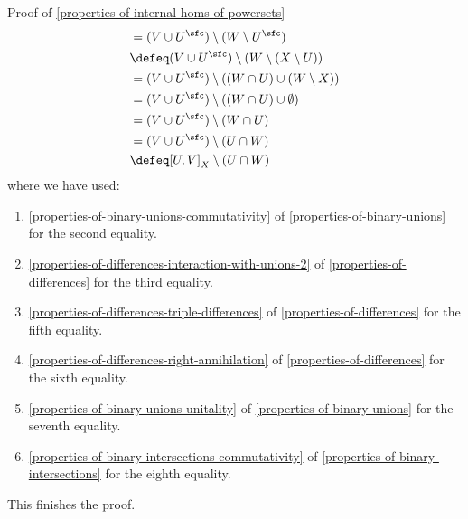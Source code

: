 \begin{Proof}{Proof of \cref{properties-of-internal-homs-of-powersets}}
\begin{align*}
                             &=      (V\cup U^{\sfc})\setminus(W\setminus U^{\sfc})\\
                             &\defeq (V\cup U^{\sfc})\setminus(W\setminus(X\setminus U))\\
                             &=      (V\cup U^{\sfc})\setminus((W\cap U)\cup(W\setminus X))\\
                             &=      (V\cup U^{\sfc})\setminus((W\cap U)\cup\emptyset)\\
                             &=      (V\cup U^{\sfc})\setminus(W\cap U)\\
                             &=      (V\cup U^{\sfc})\setminus(U\cap W)\\
                             &\defeq [U,V]_{X}\setminus(U\cap W)
    \end{align*}
    where we have used:
    \begin{enumerate}
        \item\label{proof-of-properties-of-internal-homs-of-powersets-interaction-with-differences-10}\cref{properties-of-binary-unions-commutativity} of \cref{properties-of-binary-unions} for the second equality.
        \item\label{proof-of-properties-of-internal-homs-of-powersets-interaction-with-differences-11}\cref{properties-of-differences-interaction-with-unions-2} of \cref{properties-of-differences} for the third equality.
        \item\label{proof-of-properties-of-internal-homs-of-powersets-interaction-with-differences-12}\cref{properties-of-differences-triple-differences} of \cref{properties-of-differences} for the fifth equality.
        \item\label{proof-of-properties-of-internal-homs-of-powersets-interaction-with-differences-13}\cref{properties-of-differences-right-annihilation} of \cref{properties-of-differences} for the sixth equality.
        \item\label{proof-of-properties-of-internal-homs-of-powersets-interaction-with-differences-14}\cref{properties-of-binary-unions-unitality} of \cref{properties-of-binary-unions} for the seventh equality.
        \item\label{proof-of-properties-of-internal-homs-of-powersets-interaction-with-differences-15}\cref{properties-of-binary-intersections-commutativity} of \cref{properties-of-binary-intersections} for the eighth equality.
    \end{enumerate}
    This finishes the proof.


\end{Proof}
